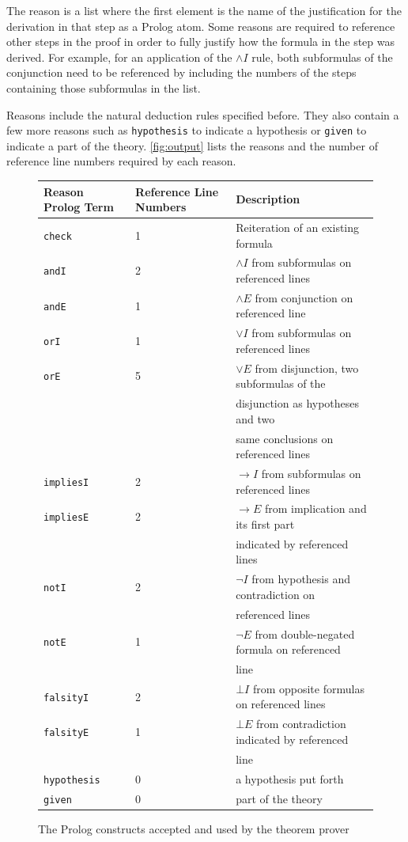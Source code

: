 \documentclass[11pt,twoside,a4paper]{report}
\begin{document}
The reason is a list where the first element is the name of the justification for the derivation in that step as a Prolog atom. Some reasons are required to reference other steps in the proof in order to fully justify how the formula in the step was derived. For example, for an application of the $\wedge I$ rule, both subformulas of the conjunction need to be referenced by including the numbers of the steps containing those subformulas in the list.

Reasons include the natural deduction rules specified before. They also contain a few more reasons such as \lstinline$hypothesis$ to indicate a hypothesis or \lstinline$given$ to indicate a part of the theory. \autoref{fig:output} lists the reasons and the number of reference line numbers required by each reason.

\begin{figure}[tph]
\begin{center}
\begin{tabular}{|l|l|l|}
\hline
Reason Prolog Term & Reference Line Numbers & Description\\
\hline
\lstinline$check$ & 1 & Reiteration of an existing formula\\
\hline
\lstinline$andI$ & 2 & $\wedge I$ from subformulas on referenced lines\\
\hline
\lstinline$andE$ & 1 & $\wedge E$ from conjunction on referenced line\\
\hline
\lstinline$orI$ & 1 & $\vee I$ from subformulas on referenced lines\\
\hline
\lstinline$orE$ & 5 & $\vee E$ from disjunction, two subformulas of the\\
&& disjunction as hypotheses and two\\
&& same conclusions on referenced lines\\
\hline
\lstinline$impliesI$ & 2 & $\rightarrow I$ from subformulas on referenced lines\\
\hline
\lstinline$impliesE$ & 2 & $\rightarrow E$ from implication and its first part\\
&& indicated by referenced lines\\
\hline
\lstinline$notI$ & 2 & $\neg I$ from hypothesis and contradiction on \\
&& referenced lines\\
\hline
\lstinline$notE$ & 1 & $\neg E$ from double-negated formula on referenced\\
&& line\\
\hline
\lstinline$falsityI$ & 2 & $\bot I$ from opposite formulas on referenced lines\\
\hline
\lstinline$falsityE$ & 1 & $\bot E$ from contradiction indicated by referenced\\
&& line\\
\hline
\lstinline$hypothesis$ & 0 & a hypothesis put forth\\
\hline
\lstinline$given$ & 0 & part of the theory\\
\hline
\end{tabular}
\end{center}
\caption{The Prolog constructs accepted and used by the theorem prover\label{fig:output}}
\end{figure}
\end{document}
